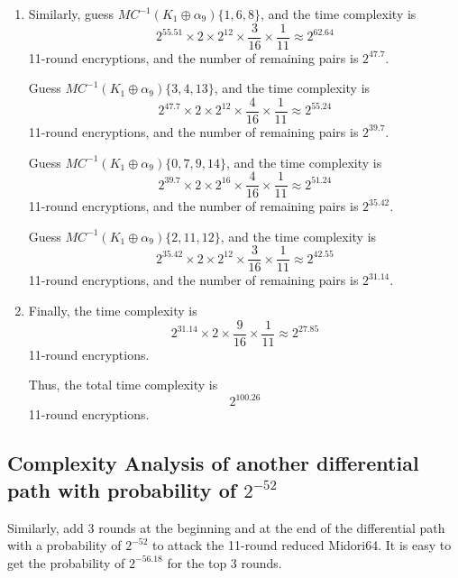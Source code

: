 \documentclass[journal=tosc,preprint]{iacrtrans}
\begin{document}
\begin{enumerate}
        \item Similarly, guess $MC^{-1}(K_1 \oplus \alpha_9)\{1, 6, 8\}$, and the time complexity is
              \[
                  2^{55.51} \times 2 \times 2^{12} \times \frac{3}{16} \times \frac{1}{11} \approx 2^{62.64}
              \]
              11-round encryptions, and the number of remaining pairs is $2^{47.7}$.

              Guess $MC^{-1}(K_1 \oplus \alpha_9)\{3, 4, 13\}$, and the time complexity is
              \[
                  2^{47.7} \times 2 \times 2^{12} \times \frac{4}{16} \times \frac{1}{11} \approx 2^{55.24}
              \]
              11-round encryptions, and the number of remaining pairs is $2^{39.7}$.

              Guess $MC^{-1}(K_1 \oplus \alpha_9)\{0, 7, 9, 14\}$, and the time complexity is
              \[
                  2^{39.7} \times 2 \times 2^{16} \times \frac{4}{16} \times \frac{1}{11} \approx 2^{51.24}
              \]
              11-round encryptions, and the number of remaining pairs is $2^{35.42}$.

              Guess $MC^{-1}(K_1 \oplus \alpha_9)\{2, 11, 12\}$, and the time complexity is
              \[
                  2^{35.42} \times 2 \times 2^{12} \times \frac{3}{16} \times \frac{1}{11} \approx 2^{42.55}
              \]
              11-round encryptions, and the number of remaining pairs is $2^{31.14}$.

        \item Finally, the time complexity is
              \[
                  2^{31.14} \times 2 \times \frac{9}{16} \times \frac{1}{11} \approx 2^{27.85}
              \]
              11-round encryptions.

              Thus, the total time complexity is
              \[
                  2^{100.26}
              \]
              11-round encryptions.
    \end{enumerate}


    \subsection{Complexity Analysis of another differential path with probability of $2^{-52}$}

    Similarly, add 3 rounds at the beginning and at the end of the differential
    path with a probability of $2^{-52}$ to attack the 11-round reduced
    Midori64. It is easy to get the probability of $2^{-56.18}$ for the top 3
    rounds.
\end{document}
